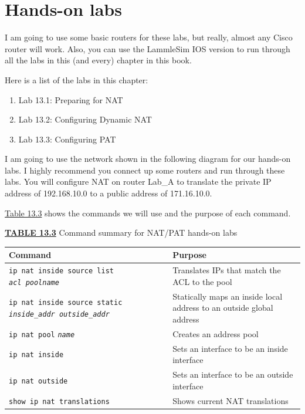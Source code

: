 \section{Hands-on labs}

I am going to use some basic routers for these labs, but really, almost
any Cisco router will work. Also, you can use the LammleSim IOS version
to run through all the labs in this (and every) chapter in this book.

Here is a list of the labs in this chapter:

\begin{enumerate}
\item
  Lab 13.1: Preparing for NAT
\item
  Lab 13.2: Configuring Dynamic NAT
\item
  Lab 13.3: Configuring PAT
\end{enumerate}

I am going to use the network shown in the following diagram for our
hands-on labs. I highly recommend you connect up some routers and run
through these labs. You will configure NAT on router Lab\_A to translate
the private IP address of 192.168.10.0 to a public address of
171.16.10.0.

\begin{figure}
\centering
\caption{}
\end{figure}

\protect\hyperlink{c13.xhtmlux5cux23table13-3}{Table 13.3} shows the
commands we will use and the purpose of each command.



{\protect\hyperlink{c13.xhtmlux5cux23tableanchor13-3}{\textbf{TABLE
13.3}} Command summary for NAT/PAT hands-on labs}

\begin{longtable}[]{@{}ll@{}}
\toprule
Command & Purpose\tabularnewline
\midrule
\endhead
\texttt{ip\ nat\ inside\ source\ list}
\emph{\texttt{acl\ pool}\texttt{name}} & Translates IPs that match the
ACL to the pool\tabularnewline
\texttt{ip\ nat\ inside\ source\ static}
\emph{\texttt{inside\_addr\ outside\_addr}} & Statically maps an inside
local address to an outside global address\tabularnewline
\texttt{ip\ nat\ pool} \emph{\texttt{name}} & Creates an address
pool\tabularnewline
\texttt{ip\ nat\ inside} & Sets an interface to be an inside
interface\tabularnewline
\texttt{ip\ nat\ outside} & Sets an interface to be an outside
interface\tabularnewline
\texttt{show\ ip\ nat\ translations} & Shows current NAT
translations\tabularnewline
\bottomrule
\end{longtable}




